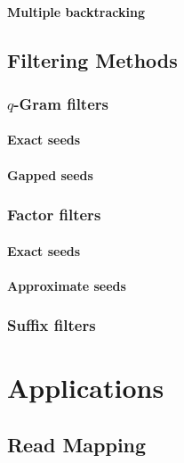 \subsection{Multiple backtracking}

\chapter{Filtering Methods}
\section{$q$-Gram filters}
\subsection{Exact seeds}
\subsection{Gapped seeds}
\section{Factor filters}
\subsection{Exact seeds}
\subsection{Approximate seeds}
\section{Suffix filters}


\part{Applications}

\chapter{Read Mapping}
